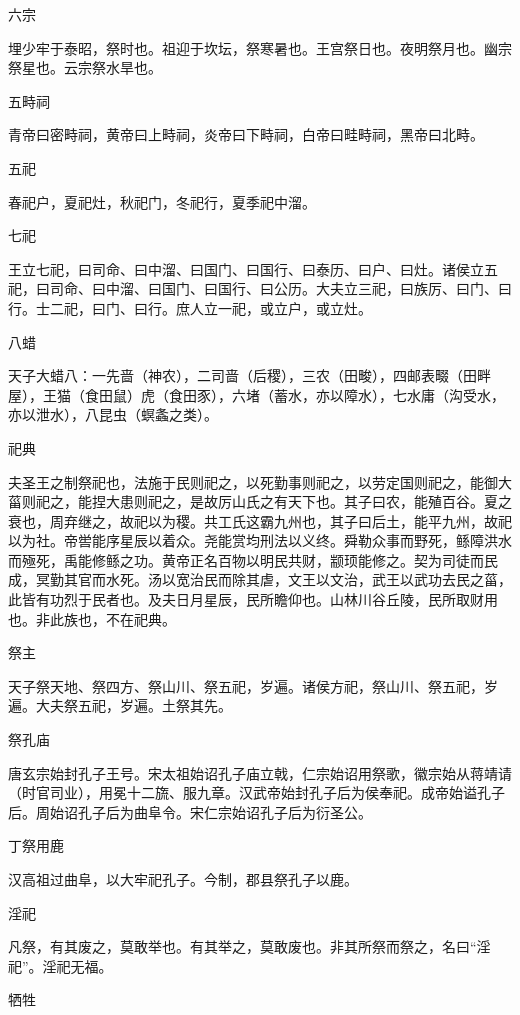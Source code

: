 \documentclass[a4paper,12pt,UTF8,twoside]{ctexbook}
\begin{document}
    六宗
    
    埋少牢于泰昭，祭时也。祖迎于坎坛，祭寒暑也。王宫祭日也。夜明祭月也。幽宗祭星也。云宗祭水旱也。
    
    五畤祠
    
    青帝曰密畤祠，黄帝曰上畤祠，炎帝曰下畤祠，白帝曰畦畤祠，黑帝曰北畤。
    
    五祀
    
    春祀户，夏祀灶，秋祀门，冬祀行，夏季祀中溜。
    
    七祀
    
    王立七祀，曰司命、曰中溜、曰国门、曰国行、曰泰历、曰户、曰灶。诸侯立五祀，曰司命、曰中溜、曰国门、曰国行、曰公历。大夫立三祀，曰族厉、曰门、曰行。士二祀，曰门、曰行。庶人立一祀，或立户，或立灶。
    
    八蜡
    
    天子大蜡八：一先啬（神农），二司啬（后稷），三农（田畯），四邮表畷（田畔屋），王猫（食田鼠）虎（食田豕），六堵（蓄水，亦以障水），七水庸（沟受水，亦以泄水），八昆虫（螟螽之类）。
    
    祀典
    
    夫圣王之制祭祀也，法施于民则祀之，以死勤事则祀之，以劳定国则祀之，能御大菑则祀之，能捏大患则祀之，是故厉山氏之有天下也。其子曰农，能殖百谷。夏之衰也，周弃继之，故祀以为稷。共工氏这霸九州也，其子曰后土，能平九州，故祀以为社。帝喾能序星辰以着众。尧能赏均刑法以义终。舜勒众事而野死，鲧障洪水而殛死，禹能修鲧之功。黄帝正名百物以明民共财，颛顼能修之。契为司徒而民成，冥勤其官而水死。汤以宽治民而除其虐，文王以文治，武王以武功去民之菑，此皆有功烈于民者也。及夫日月星辰，民所瞻仰也。山林川谷丘陵，民所取财用也。非此族也，不在祀典。
    
    祭主
    
    天子祭天地、祭四方、祭山川、祭五祀，岁遍。诸侯方祀，祭山川、祭五祀，岁遍。大夫祭五祀，岁遍。土祭其先。
    
    祭孔庙
    
    唐玄宗始封孔子王号。宋太祖始诏孔子庙立戟，仁宗始诏用祭歌，徽宗始从蒋靖请（时官司业），用冕十二旒、服九章。汉武帝始封孔子后为侯奉祀。成帝始谥孔子后。周始诏孔子后为曲阜令。宋仁宗始诏孔子后为衍圣公。
    
    丁祭用鹿
    
    汉高祖过曲阜，以大牢祀孔子。今制，郡县祭孔子以鹿。
    
    淫祀
    
    凡祭，有其废之，莫敢举也。有其举之，莫敢废也。非其所祭而祭之，名曰“淫祀”。淫祀无福。
    
    牺牲
    
\end{document}
